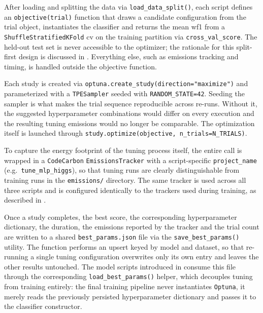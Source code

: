 After loading and splitting the data via \texttt{load\_data\_split()}, each script defines an \texttt{objective(trial)} function that draws a candidate configuration from the trial object, instantiates the classifier and returns the mean \gls{wf1} from a \texttt{ShuffleStratifiedKFold} \gls{cv} on the training partition via \texttt{cross\_val\_score}. The held-out test set is never accessible to the optimizer; the rationale for this split-first design is discussed in . Everything else, such as emissions tracking and timing, is handled outside the objective function.

Each study is created via \texttt{optuna.create\_study(direction="maximize")} and parameterized with a \texttt{TPESampler} seeded with \texttt{RANDOM\_STATE=42}. Seeding the sampler is what makes the trial sequence reproducible across re-runs. Without it, the suggested hyperparameter combinations would differ on every execution and the resulting tuning emissions would no longer be comparable. The optimization itself is launched through \texttt{study.optimize(objective, n\_trials=N\_TRIALS)}.

To capture the energy footprint of the tuning process itself, the entire  call is wrapped in a \texttt{CodeCarbon} \texttt{EmissionsTracker} with a script-specific \texttt{project\_name} (e.g.\ \texttt{tune\_mlp\_higgs}), so that tuning runs are clearly distinguishable from training runs in the \texttt{emissions/} directory. The same tracker is used across all three scripts and is configured identically to the trackers used during training, as described in .

Once a study completes, the best score, the corresponding hyperparameter dictionary, the duration, the emissions reported by the tracker and the trial count are written to a shared \texttt{best\_params.json} file via the \texttt{save\_best\_params()} utility. The function performs an upsert keyed by model and dataset, so that re-running a single tuning configuration overwrites only its own entry and leaves the other results untouched. The model scripts introduced in  consume this file through the corresponding \texttt{load\_best\_params()} helper, which decouples tuning from training entirely: the final training pipeline never instantiates \texttt{Optuna}, it merely reads the previously persisted hyperparameter dictionary and passes it to the classifier constructor.




